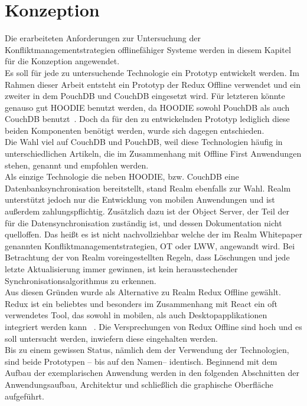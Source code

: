 \chapter{\label{chap:konzeption}Konzeption}
Die erarbeiteten Anforderungen zur Untersuchung der Konfliktmanagementstrategien offlinefähiger Systeme werden in diesem Kapitel für die Konzeption angewendet.\\
Es soll für jede zu untersuchende Technologie ein Prototyp entwickelt werden. Im Rahmen dieser Arbeit entsteht ein Prototyp der Redux Offline verwendet und ein zweiter in dem PouchDB und CouchDB eingesetzt wird. Für letzteren könnte genauso gut HOODIE benutzt werden, da HOODIE sowohl PouchDB als auch CouchDB benutzt~\cite{hoodie-how}.
Doch da für den zu entwickelnden Prototyp lediglich diese beiden Komponenten benötigt werden, wurde sich dagegen entschieden.\\
%
Die Wahl viel auf CouchDB und PouchDB, weil diese Technologien häufig in unterschiedlichen Artikeln, die im Zusammenhang mit Offline First Anwendungen stehen, genannt und empfohlen werden.\\
% 
Als einzige Technologie die neben HOODIE, bzw. CouchDB eine Datenbanksynchronisation bereitstellt, stand Realm ebenfalls zur Wahl.
Realm unterstützt jedoch nur die Entwicklung von mobilen Anwendungen und ist außerdem zahlungspflichtig.
Zusätzlich dazu ist der Object Server, der Teil der für die Datensynchronisation zuständig ist, und dessen Dokumentation nicht quelloffen.
Das heißt es ist nicht nachvollziehbar welche der im Realm Whitepaper genannten Konfliktmanagementstrategien, \gls{OT} oder \gls{LWW}, angewandt wird.
Bei Betrachtung der von Realm voreingestellten Regeln, dass Löschungen und jede letzte Aktualisierung immer gewinnen, ist kein herausstechender Synchronisationsalgorithmus zu erkennen.\\
% 
Aus diesen Gründen wurde als Alternative zu Realm Redux Offline gewählt. Redux ist ein beliebtes und besonders im Zusammenhang mit React ein oft verwendetes Tool, das sowohl in mobilen, als auch Desktopapplikationen integriert werden kann ~\cite{statereact}.
Die Versprechungen von Redux Offline sind hoch und es soll untersucht werden, inwiefern diese eingehalten werden.\\
% 
% 
% 
Bis zu einem gewissen Status, nämlich dem der Verwendung der Technologien, sind beide Prototypen -- bis auf den Namen-- identisch.
Beginnend mit dem Aufbau der exemplarischen Anwendung werden in den folgenden Abschnitten der Anwendungsaufbau, Architektur und schließlich die graphische Oberfläche aufgeführt.
%
%
